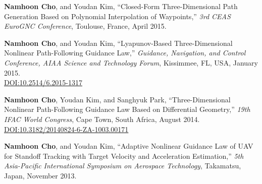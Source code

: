 \begin{enumerate}[itemsep=0.5em, label={[}C\arabic*{]}]
\item \textbf{Namhoon Cho}, and Youdan Kim, ``Closed-Form Three-Dimensional Path Generation Based on Polynomial Interpolation of Waypoints,'' \textit{3rd CEAS EuroGNC Conference}, Toulouse, France, April 2015. 

\item \textbf{Namhoon Cho}, and Youdan Kim, ``Lyapunov-Based Three-Dimensional Nonlinear Path-Following Guidance Law,'' \textit{Guidance, Navigation, and Control Conference, AIAA Science and Technology Forum}, Kissimmee, FL, USA, January 2015. \\
\href{https://doi.org/10.2514/6.2015-1317}{DOI:10.2514/6.2015-1317}

\item \textbf{Namhoon Cho}, Youdan Kim, and Sanghyuk Park, ``Three-Dimensional Nonlinear Path-Following Guidance Law Based on Differential Geometry,'' \textit{19th IFAC World Congress}, Cape Town, South Africa, August 2014. \\
\href{https://doi.org/10.3182/20140824-6-ZA-1003.00171}{DOI:10.3182/20140824-6-ZA-1003.00171}

\item \textbf{Namhoon Cho}, and Youdan Kim, ``Adaptive Nonlinear Guidance Law of UAV for Standoff Tracking with Target Velocity and Acceleration Estimation,'' \textit{5th Asia-Pacific International Symposium on Aerospace Technology}, Takamatsu, Japan, November 2013. 

\end{enumerate}
\vspace{0.5em}

